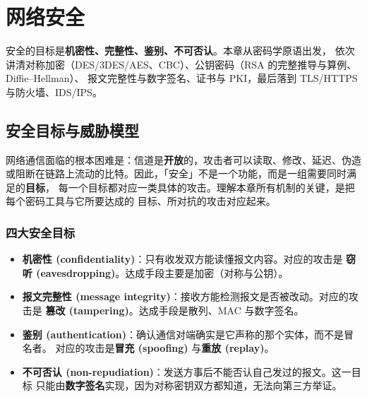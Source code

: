 \clearpage
\begingroup
\let\clearpage\relax
\let\cleardoublepage\relax
\vspace*{\fill}
\chapter{网络安全}
\begin{center}
安全的目标是\textbf{机密性、完整性、鉴别、不可否认}。本章从密码学原语出发，
依次讲清对称加密（DES/3DES/AES、CBC）、公钥密码（RSA 的完整推导与算例、Diffie--Hellman）、
报文完整性与数字签名、证书与 PKI，最后落到 TLS/HTTPS 与防火墙、IDS/IPS。
\end{center}
\vspace*{\fill}
\endgroup
\clearpage

\section{安全目标与威胁模型}

网络通信面临的根本困难是：信道是\textbf{开放}的，攻击者可以读取、修改、延迟、伪造
或阻断在链路上流动的比特。因此，「安全」不是一个功能，而是一组需要同时满足的\textbf{目标}，
每一个目标都对应一类具体的攻击。理解本章所有机制的关键，是把每个密码工具与它所要达成的
目标、所对抗的攻击对应起来。

\subsection{四大安全目标}

\begin{itemize}
    \item \textbf{机密性 (confidentiality)}：只有收发双方能读懂报文内容。对应的攻击是
    \textbf{窃听 (eavesdropping)}。达成手段主要是加密（对称与公钥）。
    \item \textbf{报文完整性 (message integrity)}：接收方能检测报文是否被改动。对应的攻击是
    \textbf{篡改 (tampering)}。达成手段是散列、MAC 与数字签名。
    \item \textbf{鉴别 (authentication)}：确认通信对端确实是它声称的那个实体，而不是冒名者。
    对应的攻击是\textbf{冒充 (spoofing)} 与\textbf{重放 (replay)}。
    \item \textbf{不可否认 (non-repudiation)}：发送方事后不能否认自己发过的报文。这一目标
    只能由\textbf{数字签名}实现，因为对称密钥双方都知道，无法向第三方举证。
\end{itemize}

